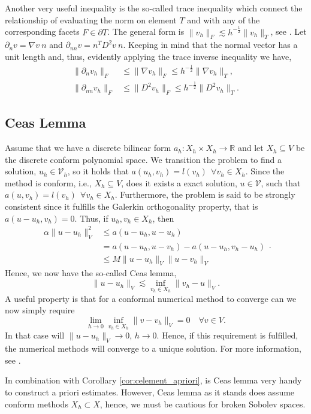 Another very useful inequality is the so-called trace inequality which connect the relationship of evaluating the norm on element $ T $ and with any of the corresponding facets $F \in \partial T$. The general form is $\| v_{h} \|_{F   }^{  }  \lesssim
h^{-\frac{1}{2}} \| v_{h} \|_{ T  }^{  } $, see \cite[Lemma 12.8]{ErnGuermond2021}. Let $\partial _{n} v = \nabla v \ n$ and $\partial_{nn} v = n^{T} D^2 v \ n $. Keeping in mind that the normal vector has a unit length and, thus, evidently applying the
trace inverse inequality we have,
\begin{equation}
    \label{eq:fund_inv_est}
\begin{split}
    \| \partial _{n} v_{h} \|_{F  }^{  }  & \le \| \nabla v_{h} \|_{F  }^{  }  \le h^{-\frac{1}{2}} \| \nabla  v_{h} \|_{T  }^{  },  \\
    \| \partial _{nn} v_{h} \|_{ F }^{  } & \le  \| D^2 v_{h} \|_{ F }^{  }   \le  h^{-\frac{1}{2}} \| D^2 v_{h} \|_{ T }^{  }.
\end{split}
\end{equation}

\subsection{Ceas Lemma}%
\label{sub:ceas_lemma}

Assume that we have a discrete bilinear form $a_{h}: X_{h}\times X_{h} \to \mathbb{R} $ and let $X _{h} \subseteq  V $ be the discrete conform polynomial space. We transition the problem to find a solution, $u_{h} \in  \mathcal{V}_{h}$, so it holds that $a\left( u_{h},v_{h} \right)  = l\left( v_{h} \right) \ \  \forall v_{h} \in X _{h} $.
Since the method is conform, i.e., $X _{h} \subseteq  V $, does it exists a exact solution, $u \in  \mathcal{V}$, such that \(
a \left( u, v_{h} \right)  = l\left( v_{h} \right)  \ \  \forall v_{h} \in  X _{h}.
\)
Furthermore, the problem is said to be strongly consistent since it fulfills the Galerkin orthogonality property, that is $ a\left( u -u_{h} , v_{h} \right)  =0$. Thus, if $u_{h},v_{h} \in  X _{h}$, then
\begin{equation}
\label{eq:cealemma_proof}
    \begin{split}
\alpha \| u -u_{h} \|_{ V  }^{ 2 } & \le  a\left( u - u_{h}, u - u_{h}  \right)    \\
&= a\left( u - u_{h}, u -v_{h} \right) - a\left( u -u_{h}, v_{h} - u_{h} \right)  \\
 &  \le  M \| u - u_{h} \|_{ V  }^{  }  \| u - v_{h} \|_{ V  }^{  }
    \end{split}
.\end{equation}
Hence, we now have the so-called Ceas lemma, \[
\| u - u_{h} \|_{ V  }^{  }  \lesssim  \inf_{v_{h} \in X_{h} } \|  v_{h} - u \|_{V  }^{  }.
\]
A useful property is that for a conformal numerical method to converge can we now simply require \[
\lim_{h \to 0}  \inf_{v_{h} \in  X_{h}}  \| v - v_{h} \|_{ V  }^{  } = 0 \quad  \forall v \in V.
\]
In that case will $\| u - u_{h} \|_{ V  }^{  }  \to  0$, $h \to  0$. Hence, if this requirement is fulfilled, the numerical methods will converge to a unique solution.
For more information, see \cite[pp. 66]{quartdiff}.

In combination with Corollary \ref{cor:celement_apriori}, is Ceas lemma very handy to construct a priori estimates. However, Ceas lemma as it stands does assume conform methods $X_{h} \subset X$, hence, we must be cautious for broken Sobolev spaces.





